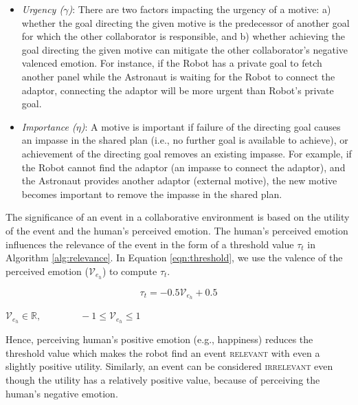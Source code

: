 \documentclass[12pt]{report}
\begin{document}
\begin{itemize}
  \setlength\itemsep{1mm}
  \item \textit{Urgency ($\gamma$)}: There are two factors impacting the urgency
  of a motive: a) whether the goal directing the given motive is the predecessor of
  another goal for which the other collaborator is responsible, and b) whether
  achieving the goal directing the given motive can mitigate the other
  collaborator's negative valenced emotion. For instance, if the Robot has a
  private goal to fetch another panel while the Astronaut is waiting for the
  Robot to connect the adaptor, connecting the adaptor will be more urgent than
  Robot's private goal.
  \item \textit{Importance ($\eta$)}: A motive is important if failure of the
  directing goal causes an impasse in the shared plan (i.e., no further goal is
  available to achieve), or achievement of the directing goal removes an
  existing impasse. For example, if the Robot cannot find the adaptor (an
  impasse to connect the adaptor), and the Astronaut provides another adaptor
  (external motive), the new motive becomes important to remove the impasse in
  the shared plan.
\end{itemize}

The significance of an event in a collaborative environment is based on the
utility of the event and the human's perceived emotion. The human's perceived
emotion influences the relevance of the event in the form of a threshold value
$\tau_{t}$ in Algorithm \ref{alg:relevance}. In Equation \ref{eqn:threshold}, we
use the valence of the perceived emotion ($\mathcal{V}_{e_h}$) to compute
$\tau_{t}$.

\begin{equation}
    \tau_{t}= 
       -0.5\mathcal{V}_{e_h} + 0.5
    \label{eqn:threshold}
\end{equation}

\begin{center} 
    $\mathcal{V}_{e_h} \in \mathbb{R}, \qquad\qquad -1 \leq \mathcal{V}_{e_h}
    \leq 1$
\end{center}

Hence, perceiving human's positive emotion (e.g., happiness) reduces the
threshold value which makes the robot find an event \textsc{relevant} with even
a slightly positive utility. Similarly, an event can be considered
\textsc{irrelevant} even though the utility has a relatively positive value,
because of perceiving the human's negative emotion.
\end{document}
